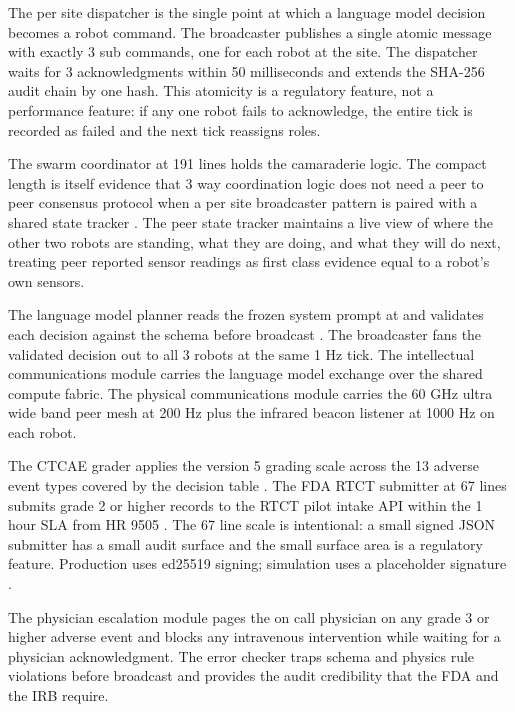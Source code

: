 \begin{sectionaccent}
The per site dispatcher  is the single point at
which a language model decision becomes a robot command. The
broadcaster publishes a single atomic message with exactly 3 sub
commands, one for each robot at the site. The dispatcher waits for 3
acknowledgments within 50 milliseconds and extends the SHA-256 audit
chain by one hash. This atomicity is a regulatory feature, not a
performance feature: if any one robot fails to acknowledge, the
entire tick is recorded as failed and the next tick reassigns roles.

The swarm coordinator at 191 lines holds the camaraderie logic. The
compact length is itself evidence that 3 way coordination logic does
not need a peer to peer consensus protocol when a per site
broadcaster pattern is paired with a shared state tracker
\cite{kawchak_2026_humanoid_instructions}. The peer state tracker
maintains a live view of where the other two robots are standing,
what they are doing, and what they will do next, treating peer
reported sensor readings as first class evidence equal to a robot's
own sensors.

The language model planner reads the frozen system prompt at
 and validates each decision against the
 schema before broadcast
\cite{anthropic_claude_opus_47_2026}. The broadcaster fans the
validated decision out to all 3 robots at the same 1 Hz tick. The
intellectual communications module carries the language model
exchange over the shared compute fabric. The physical communications
module carries the 60 GHz ultra wide band peer mesh at 200 Hz plus
the infrared beacon listener at 1000 Hz on each robot.

The CTCAE grader applies the version 5 grading scale across the 13
adverse event types covered by the decision table
\cite{ctcae_v5_2017}. The FDA RTCT submitter at 67 lines submits
grade 2 or higher records to the RTCT pilot intake API within the 1
hour SLA from HR 9505 \cite{fda_rtct_2026, fda2026realtime}. The 67
line scale is intentional: a small signed JSON submitter has a small
audit surface and the small surface area is a regulatory feature.
Production uses ed25519 signing; simulation uses a placeholder
signature \cite{iec_62304}.

The physician escalation module pages the on call physician on any
grade 3 or higher adverse event and blocks any intravenous
intervention while waiting for a physician acknowledgment. The error
checker traps schema and physics rule violations before broadcast and
provides the audit credibility that the FDA and the IRB require.


\end{sectionaccent}
